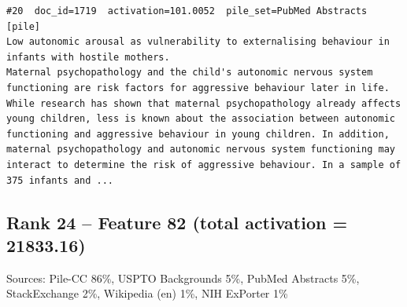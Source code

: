 \begin{verbatim}
#20  doc_id=1719  activation=101.0052  pile_set=PubMed Abstracts  [pile]
Low autonomic arousal as vulnerability to externalising behaviour in infants with hostile mothers.
Maternal psychopathology and the child's autonomic nervous system functioning are risk factors for aggressive behaviour later in life. While research has shown that maternal psychopathology already affects young children, less is known about the association between autonomic functioning and aggressive behaviour in young children. In addition, maternal psychopathology and autonomic nervous system functioning may interact to determine the risk of aggressive behaviour. In a sample of 375 infants and ...

\end{verbatim}

\subsection*{Rank 24 -- Feature 82 (total activation = 21833.16)}

Sources: Pile-CC 86\%, USPTO Backgrounds 5\%, PubMed Abstracts 5\%, StackExchange 2\%, Wikipedia (en) 1\%, NIH ExPorter 1\%

